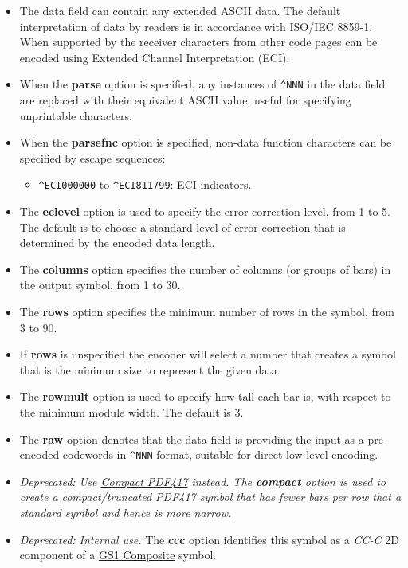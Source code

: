 \begin{itemize}
\tightlist
\item
  The data field can contain any extended ASCII data. The default
  interpretation of data by readers is in accordance with ISO/IEC
  8859-1. When supported by the receiver characters from other code
  pages can be encoded using Extended Channel Interpretation (ECI).
\item
  When the \textbf{parse} option is specified, any instances of
  \texttt{\^{}NNN} in the data field are replaced with their equivalent
  ASCII value, useful for specifying unprintable characters.
\item
  When the \textbf{parsefnc} option is specified, non-data function
  characters can be specified by escape sequences:

  \begin{itemize}
  \tightlist
  \item
    \texttt{\^{}ECI000000} to \texttt{\^{}ECI811799}: ECI indicators.
  \end{itemize}
\item
  The \textbf{eclevel} option is used to specify the error correction
  level, from 1 to 5. The default is to choose a standard level of error
  correction that is determined by the encoded data length.
\item
  The \textbf{columns} option specifies the number of columns (or groups
  of bars) in the output symbol, from 1 to 30.
\item
  The \textbf{rows} option specifies the minimum number of rows in the
  symbol, from 3 to 90.
\item
  If \textbf{rows} is unspecified the encoder will select a number that
  creates a symbol that is the minimum size to represent the given data.
\item
  The \textbf{rowmult} option is used to specify how tall each bar is,
  with respect to the minimum module width. The default is 3.
\item
  The \textbf{raw} option denotes that the data field is providing the
  input as a pre-encoded codewords in \texttt{\^{}NNN} format, suitable
  for direct low-level encoding.
\item
  \emph{Deprecated: Use \protect\hyperlink{compact-pdf417}{Compact
  PDF417} instead. The \textbf{compact} option is used to create a
  compact/truncated PDF417 symbol that has fewer bars per row that a
  standard symbol and hence is more narrow.}
\item
  \emph{Deprecated: Internal use.} The \textbf{ccc} option identifies
  this symbol as a \emph{CC-C} 2D component of a
  \protect\hyperlink{gs1-composite-symbols}{GS1 Composite} symbol.
\end{itemize}

